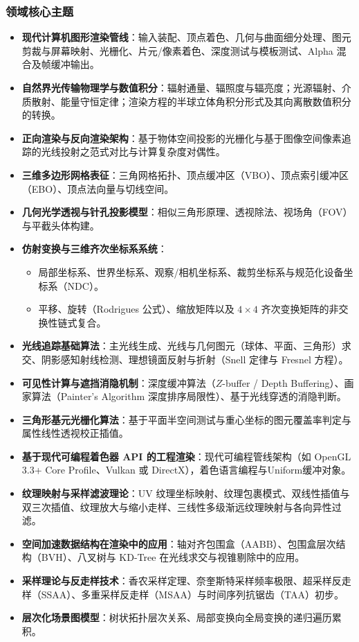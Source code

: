 \subsubsection{领域核心主题}
\begin{itemize}
    \item \textbf{现代计算机图形渲染管线}：输入装配、顶点着色、几何与曲面细分处理、图元剪裁与屏幕映射、光栅化、片元/像素着色、深度测试与模板测试、Alpha 混合及帧缓冲输出。
    \item \textbf{自然界光传输物理学与数值积分}：辐射通量、辐照度与辐亮度；光源辐射、介质散射、能量守恒定律；渲染方程的半球立体角积分形式及其向离散数值积分的转换。
    \item \textbf{正向渲染与反向渲染架构}：基于物体空间投影的光栅化与基于图像空间像素追踪的光线投射之范式对比与计算复杂度对偶性。
    \item \textbf{三维多边形网格表征}：三角网格拓扑、顶点缓冲区（VBO）、顶点索引缓冲区（EBO）、顶点法向量与切线空间。
    \item \textbf{几何光学透视与针孔投影模型}：相似三角形原理、透视除法、视场角（FOV）与平截头体构建。
    \item \textbf{仿射变换与三维齐次坐标系系统}：
    \begin{itemize}
        \item 局部坐标系、世界坐标系、观察/相机坐标系、裁剪坐标系与规范化设备坐标系（NDC）。
        \item 平移、旋转（Rodrigues 公式）、缩放矩阵以及 $4\times 4$ 齐次变换矩阵的非交换性链式复合。
    \end{itemize}
    \item \textbf{光线追踪基础算法}：主光线生成、光线与几何图元（球体、平面、三角形）求交、阴影感知射线检测、理想镜面反射与折射（Snell 定律与 Fresnel 方程）。
    \item \textbf{可见性计算与遮挡消隐机制}：深度缓冲算法（$Z$-buffer / Depth Buffering）、画家算法（Painter's Algorithm 深度排序局限性）、基于光线穿透的消隐判断。
    \item \textbf{三角形基元光栅化算法}：基于平面半空间测试与重心坐标的图元覆盖率判定与属性线性透视校正插值。
    \item \textbf{基于现代可编程着色器 API 的工程渲染}：现代可编程管线架构（如 OpenGL 3.3+ Core Profile、Vulkan 或 DirectX），着色语言编程与Uniform缓冲对象。
    \item \textbf{纹理映射与采样滤波理论}：UV 纹理坐标映射、纹理包裹模式、双线性插值与双三次插值、纹理放大与缩小走样、三线性多级渐远纹理映射与各向异性过滤。
    \item \textbf{空间加速数据结构在渲染中的应用}：轴对齐包围盒（AABB）、包围盒层次结构（BVH）、八叉树与 KD-Tree 在光线求交与视锥剔除中的应用。
    \item \textbf{采样理论与反走样技术}：香农采样定理、奈奎斯特采样频率极限、超采样反走样（SSAA）、多重采样反走样（MSAA）与时间序列抗锯齿（TAA）初步。
    \item \textbf{层次化场景图模型}：树状拓扑层次关系、局部变换向全局变换的递归遍历累积。
\end{itemize}

